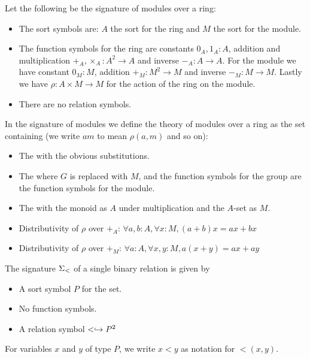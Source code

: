 \begin{dfn}
    Let the following be the signature of modules over a ring:
    \begin{itemize}
        \item The sort symbols are: $A$ the sort for the ring and 
            $M$ the sort for the module.
        \item The function symbols for the ring are constants 
            $0_A, 1_A : A$, addition and multiplication
            $+_A, \times_A : A^2 \to A$ and inverse $-_A : A \to A$.
            For the module we have constant $0_M : M$, 
            addition $+_M : M^2 \to M$ and inverse $-_M : M \to M$.
            Lastly we have $\rho : A \times M \to M$ 
            for the action of the ring on the module.
        \item There are no relation symbols.
    \end{itemize}
    
    In the signature of modules we define the theory of 
    modules over a ring as the set containing
    (we write $a m$ to mean $\rho(a,m)$ and so on):
    \begin{itemize}
        \item The  
        with the obvious substitutions.
        \item The  
        where $G$ is replaced with $M$,
        and the function symbols for the group are the function 
        symbols for the module.
        \item The  
        with the monoid as $A$
        under multiplication and the $A$-set as $M$.
        \item Distributivity of $\rho$ over $+_A$:
        $\forall a , b : A, \forall x: M, (a + b) x = a x + b x$
        \item Distributivity of $\rho$ over $+_M$: 
        $\forall a : A, \forall x, y : M, a (x + y) = a x + a y$
    \end{itemize}
\end{dfn}

\begin{dfn}
    The signature $\Sigma_{<}$ of a single binary relation is given by 
    \begin{itemize}
        \item A sort symbol $P$ for the set.
        \item No function symbols.
        \item A relation symbol $< \hookrightarrow P^2$
    \end{itemize}
    For variables $x$ and $y$ of type $P$, 
    we write $x < y$ as notation for $<(x,y)$.
\end{dfn}

